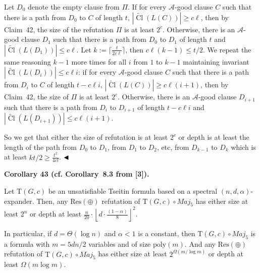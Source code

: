 Let $D_{0}$ denote the empty clause from $\Pi$. If for every $\mathcal{A}$-good clause $C$ such that there is a path from $D_{0}$ to $C$ of length $t$, $|\widetilde{\mathop{\mathrm{Cl}}}(L(C))|\geq c\ell$, then by Claim 42, the size of the refutation $\Pi$ is at least $2^{c}$. Otherwise, there is an $\mathcal{A}$-good clause $D_{1}$ such that there is a path from $D_{0}$ to $D_{1}$ of length $t$ and $|\widetilde{\mathop{\mathrm{Cl}}}(L(D_{1}))|\leq c\ell$. Let $k:=\lceil\frac{t}{2c\ell}\rceil$, then $c\ell(k-1)\leq t/2$. We repeat the same reasoning $k-1$ more times for all $i$ from $1$ to $k-1$ maintaining invariant $|\widetilde{\mathop{\mathrm{Cl}}}(L(D_{i}))|\leq c\ell i$:
if for every $\mathcal{A}$-good clause $C$ such that there is a path from $D_{i}$ to $C$ of length $t-c\ell i$, $|\widetilde{\mathop{\mathrm{Cl}}}(L(C))|\geq c\ell(i+1)$, then by Claim 42, the size of $\Pi$ is at least $2^{c}$. Otherwise, there is an $\mathcal{A}$-good clause $D_{i+1}$ such that there is a path from $D_{i}$ to $D_{i+1}$ of length $t-c\ell i$ and $|\widetilde{\mathop{\mathrm{Cl}}}(L(D_{i+1}))|\leq c\ell(i+1)$.\par



So we get that either the size of refutation is at least $2^{c}$ or depth is at least the length of the path from $D_{0}$ to $D_{1}$, from $D_{1}$ to $D_{2}$, etc, from $D_{k-1}$ to $D_{k}$ which is at least $kt/2\geq\frac{t^{2}}{4cl}$.
$\hfill\blacktriangleleft$\par



\par\medskip\noindent\textbf{
Corollary 43 (cf. Corollary 8.3 from [3]).
}\par



Let $\mathrm{T}(G,c)$ be an unsatisfiable Tseitin formula based on a spectral $(n,d,\alpha)$-expander. Then, any $\mathrm{Res}(\oplus)$ refutation of $\mathrm{T}(G,c)\circ Maj_{5}$ has either size at least $2^{n}$ or depth at least $\frac{n}{20}\cdot\left\lfloor d\cdot\frac{(1-\alpha)}{8}\right\rfloor^{2}$.\par




In particular, if $d=\Theta(\log n)$ and $\alpha<1$ is a constant, then $\mathrm{T}(G,c)\circ Maj_{5}$ is a formula with $m=5dn/2$ variables and of size $\mathrm{poly}(m)$. And any $\mathrm{Res}(\oplus)$ refutation of $\mathrm{T}(G,c)\circ Maj_{5}$ has either size at least $2^{\Omega(m/\log m)}$ or depth at least $\Omega(m\log m)$.\par



